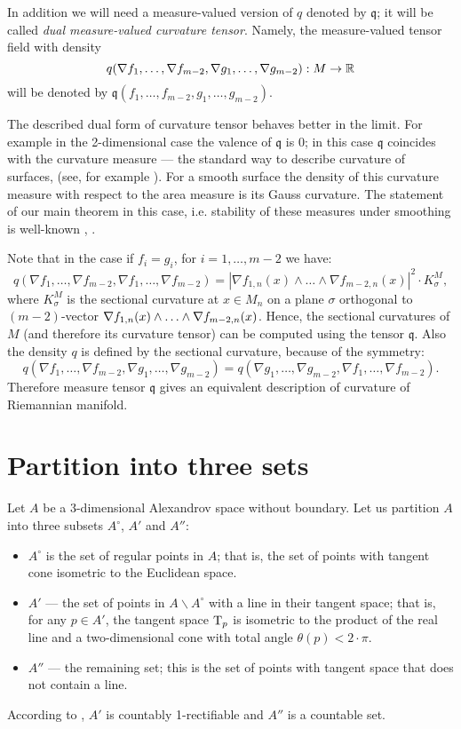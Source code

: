 In addition we will need a measure-valued version of $q$ denoted by $\mathfrak{q}$;
it will be called \emph{dual measure-valued curvature tensor}.
Namely, the measure-valued tensor field with density
\[q(\nabla f_1,\dots,\nabla f_{m-2},\nabla g_1,\dots,\nabla g_{m-2}): M\to\mathbb{R}\]
will be denoted by $\mathfrak{q}(f_1,\dots,f_{m-2},g_1,\dots,g_{m-2})$.


The described dual form of curvature tensor behaves better in the limit.
For example in the 2-dimensional case the valence of $\mathfrak{q}$ is $0$;
in this case $\mathfrak{q}$ coincides with the curvature measure --- the standard way to describe curvature of surfaces, 
(see, for example \cite{R}).
For a smooth surface the density of this curvature measure with respect to the area measure
is its Gauss curvature.
The statement of our main theorem in this case, i.e. 
stability of these measures under smoothing
is well-known \cite[Theorem 8.4.2]{R}, \cite{AZ}.


Note that in the case if $f_i=g_i$, for $i=1,\dots,m-2$
we have:
$$q(\nabla f_1,\dots,\nabla f_{m-2},\nabla f_1,\dots,\nabla f_{m-2})=|\nabla f_{1,n}(x)\wedge\dots \wedge\nabla f_{m-2,n}(x)|^2\cdot K^M_\sigma, $$
where $K^M_\sigma $ is the sectional curvature at $x\in M_n$
on a plane $\sigma$ orthogonal to $(m-2)$-vector
$\nabla f_{1,n}(x)\wedge\zz\dots \wedge\nabla f_{m-2,n}(x)$.
Hence, the sectional curvatures of $M$ (and therefore its curvature tensor) can  be computed using the tensor
$\mathfrak{q}$.
Also the density $q$ is defined by the sectional curvature,
because of the symmetry:
$${q}(\nabla f_1,\dots,\nabla f_{m-2},\nabla g_1,\dots,\nabla g_{m-2})=
{q}(\nabla g_1,\dots,\nabla g_{m-2},\nabla f_1,\dots,\nabla f_{m-2}).$$
Therefore measure tensor $\mathfrak{q}$
gives an equivalent description of curvature of Riemannian manifold.


\section{Partition into three sets}

Let $A$ be a 3-dimensional Alexandrov space without boundary. 
Let us partition $A$ into three subsets $A^\circ$, $A'$ and $A''$:
\begin{itemize}
\item $A^\circ$ is the set of regular points in $A$; that is, the set of points with tangent cone isometric to the Euclidean space.
\item $A'$ --- the set of points in $A\backslash A^\circ$ with a line in their tangent space; that is, for any $p\in A'$, the tangent space $\mathrm{T}_p$ is isometric to the product of the real line and a two-dimensional cone with total angle $\theta(p)<2\cdot \pi$.
\item $A''$ --- the remaining set; this is the set of points with tangent space that does not contain a line.
\end{itemize}
According to \cite{li-naber}, $A'$ is countably 1-rectifiable and $A''$ is a countable set. 


